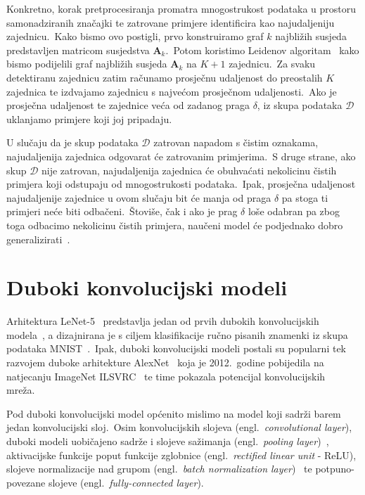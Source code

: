 \documentclass[diplomskirad]{fer}
\begin{document}
Konkretno, korak pretprocesiranja promatra mnogostrukost podataka u prostoru samonadziranih značajki te zatrovane primjere identificira kao najudaljeniju zajednicu.\ 
Kako bismo ovo postigli, prvo konstruiramo graf $k$ najbližih susjeda predstavljen matricom susjedstva $\bm{A}_k$.\ 
Potom koristimo Leidenov algoritam~\cite{traag2019louvain} kako bismo podijelili graf najbližih susjeda $\bm{A}_k$ na $K + 1$ zajednicu.\ 
Za svaku detektiranu zajednicu zatim računamo prosječnu udaljenost do preostalih $K$ zajednica te izdvajamo zajednicu s najvećom prosječnom udaljenosti.\ 
Ako je prosječna udaljenost te zajednice veća od zadanog praga $\delta$, iz skupa podataka $\mathcal{D}$ uklanjamo primjere koji joj pripadaju.\ 

U slučaju da je skup podataka $\mathcal{D}$ zatrovan napadom s čistim oznakama, najudaljenija zajednica odgovarat će zatrovanim primjerima.\ 
S druge strane, ako skup $\mathcal{D}$ nije zatrovan, najudaljenija zajednica će obuhvaćati nekolicinu čistih primjera koji odstupaju od mnogostrukosti podataka.\ 
Ipak, prosječna udaljenost najudaljenije zajednice u ovom slučaju bit će manja od praga $\delta$ pa stoga ti primjeri neće biti odbačeni.\ 
Štoviše, čak i ako je prag $\delta$ loše odabran pa zbog toga odbacimo nekolicinu čistih primjera, naučeni model će podjednako dobro generalizirati~\cite{sabolic2025seal}.\

\chapter{Duboki konvolucijski modeli}
\label{pog:cnn}

Arhitektura LeNet-5~\cite{lecun1989generalization} predstavlja jedan od prvih dubokih konvolucijskih modela~\cite{li2021survey}, a dizajnirana je s ciljem klasifikacije ručno pisanih znamenki iz skupa podataka MNIST~\cite{deng2012mnist}.\ 
Ipak, duboki konvolucijski modeli postali su popularni tek razvojem duboke arhitekture AlexNet~\cite{krizhevsky2012imagenet} koja je 2012.\ godine pobijedila na natjecanju ImageNet ILSVRC~\cite{russakovsky2015imagenet} te time pokazala potencijal konvolucijskih mreža.\ 

Pod duboki konvolucijski model općenito mislimo na model koji sadrži barem jedan konvolucijski sloj.\ 
Osim konvolucijskih slojeva (engl.\ \textit{convolutional layer}), duboki modeli uobičajeno sadrže i slojeve sažimanja (engl.\ \textit{pooling layer})~\cite{boureau2010theoretical}, aktivacijske funkcije poput funkcije zglobnice (engl.\ \textit{rectified linear unit} - ReLU), slojeve normalizacije nad grupom (engl.\ \textit{batch normalization layer})~\cite{ioffe2015batch} te potpuno-povezane slojeve (engl.\ \textit{fully-connected layer}).\ 
\end{document}
